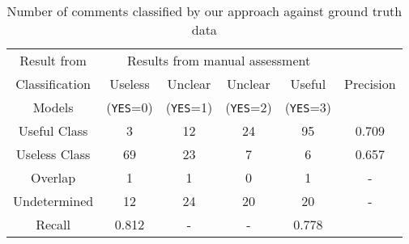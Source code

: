 
\begin{table}[!t]
\centering

\caption{Number of comments classified by our approach against ground truth data}
\begin{tabular}{cccccc}
\hline
Result from & \multicolumn{4}{c}{Results from manual assessment}  & \multirow{3}{*}{Precision}\\ \cline{2-5}
Classification &  Useless  & Unclear  & Unclear & Useful \\
Models&  (\texttt{YES}=0) & (\texttt{YES}=1) & (\texttt{YES}=2) & (\texttt{YES}=3) \\
\hline \hline
Useful Class & 3 & 12 & 24 & 95 & 0.709\\
Useless Class & 69 & 23 & 7 & 6 &  0.657\\
Overlap & 1 & 1 & 0 & 1 & - \\
Undetermined & 12 & 24 & 20 & 20 & - \\
\hline
Recall & 0.812 & - & - & 0.778\\ \hline 
\end{tabular}
\label{tb:classify_number}
\end{table}


